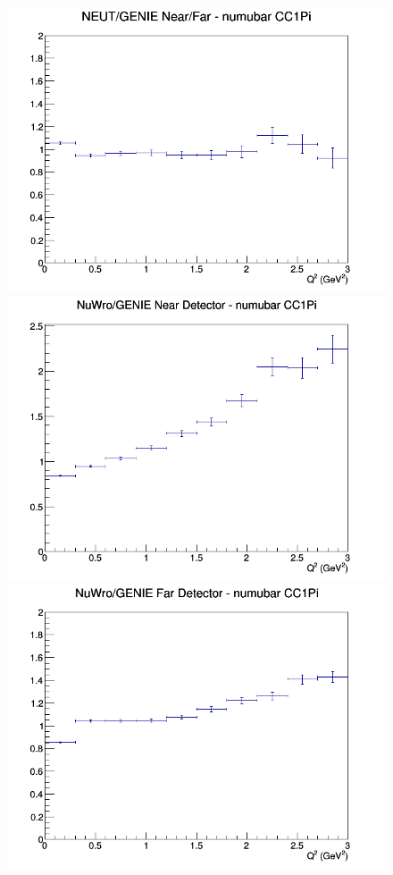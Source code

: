 \documentclass[12pt]{article}
\begin{document}
\begin{figure}[h]
\endminipage
{}
\includegraphics[width=\linewidth]{eff_Q2/FGT/ratios/CC1Pi_NEUT_GENIE_numubar_NF_Q2.png}
\endminipage
\newline
{}
\includegraphics[width=\linewidth]{eff_Q2/FGT/ratios/CC1Pi_NuWro_GENIE_numubar_near_Q2.png}
\endminipage
{}
\includegraphics[width=\linewidth]{eff_Q2/FGT/ratios/CC1Pi_NuWro_GENIE_numubar_far_Q2.png}

\end{figure}
\end{document}

